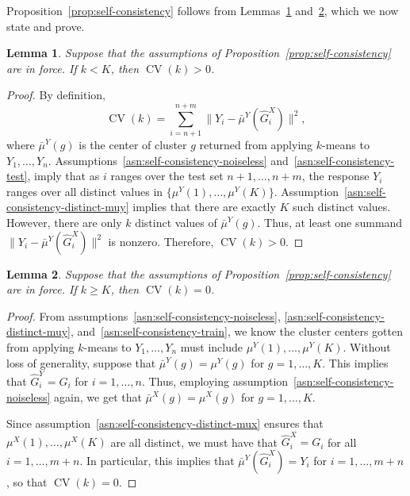 \documentclass[12pt]{article}
\newtheorem{lemma}{Lemma}
\newcommand{\CV}{\operatorname{CV}}
\newcommand{\muX}{\mu^{X}}
\newcommand{\muY}{\mu^{Y}}
\newcommand{\bmuX}{\bar \mu^{X}}
\newcommand{\bmuY}{\bar \mu^{Y}}
\newcommand{\hGX}{\hat G^{X}}
\newcommand{\hGY}{\hat G^{Y}}
\begin{document}
Proposition~\ref{prop:self-consistency} follows from
Lemmas~\ref{lem:self-consistency1} and~\ref{lem:self-consistency2}, which we
now state and prove.


\begin{lemma}\label{lem:self-consistency1}
Suppose that the assumptions of Proposition~\ref{prop:self-consistency} are in
force.  If $k < K$, then $\CV(k) > 0$.
\end{lemma}
\begin{proof}
By definition,
\[
  \CV(k)
    =
      \sum_{i=n+1}^{n+m}
        \| Y_i - \bmuY (\hGX_i) \|^2,
\]
where $\bmuY(g)$ is the center of cluster $g$ returned from applying $k$-means
to $Y_1, \dotsc, Y_n$.  Assumptions~\ref{asn:self-consistency-noiseless}
and~\ref{asn:self-consistency-test}, imply that as $i$ ranges over the test
set $n+1, \dotsc, n+m$, the response $Y_i$ ranges over all distinct values in
$\{ \muY(1), \dotsc, \muY(K) \}$.
Assumption~\ref{asn:self-consistency-distinct-muy} implies that there are
exactly $K$ such distinct values.  However, there are only $k$ distinct values
of $\bmuY(g)$.  Thus, at least one summand
\(
  \| Y_i - \bmuY(\hGX_i) \|^2
\)
is nonzero.  Therefore,
\(
  \CV(k) > 0.
\)
\end{proof}

\begin{lemma}\label{lem:self-consistency2}
Suppose that the assumptions of Proposition~\ref{prop:self-consistency} are in
force.  If $k \geq K$, then $\CV(k) = 0$.
\end{lemma}
\begin{proof}
From assumptions~\ref{asn:self-consistency-noiseless},
\ref{asn:self-consistency-distinct-muy},
and~\ref{asn:self-consistency-train}, we know the cluster centers
gotten from applying $k$-means to $Y_1, \dotsc, Y_n$ must include
$\muY(1), \dotsc, \muY(K)$.  Without loss of generality, suppose that
$\bmuY(g) = \muY(g)$ for $g = 1, \dotsc, K$.  This implies that
$\hGY_i = G_i$ for $i = 1, \dotsc, n$.  Thus, employing
assumption~\ref{asn:self-consistency-noiseless} again, we get that
$\bmuX(g) = \muX(g)$ for $g = 1, \dotsc, K$.


Since assumption~\ref{asn:self-consistency-distinct-mux} ensures that
$\muX(1), \dotsc, \muX(K)$ are all distinct, we must have that $\hGX_i = G_i$
for all $i = 1, \dotsc, m+n$.  In particular, this implies that $\bmuY(\hGX_i)
= Y_i$ for $i = 1, \dotsc, m+n$, so that $\CV(k) = 0$.
\end{proof}
\end{document}
